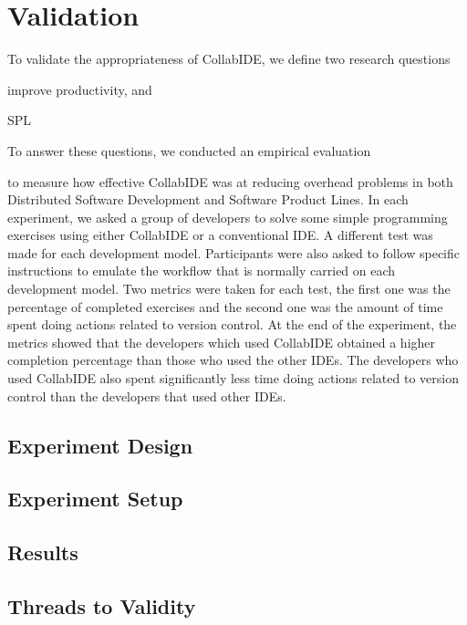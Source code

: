 

\section{Validation}
\label{sec:validation}

To validate the appropriateness of CollabIDE, we define two research questions
\begin{enumerate*}[label=(\arabic*)]
\item improve productivity, and
\item SPL
\end{enumerate*} 
To answer these questions, we conducted an empirical evaluation 

to measure how effective CollabIDE was at reducing overhead problems 
in both Distributed Software Development and Software Product Lines. In each experiment, we asked 
a group of developers to solve some simple programming exercises using either CollabIDE or a 
conventional IDE. A different test was made for each development model. Participants were also 
asked to follow specific instructions to emulate the workflow that is normally carried on each 
development model. Two metrics were taken for each test, the first one was the percentage of 
completed exercises and the second one was the amount of time spent doing actions related to 
version control.
At the end of the experiment, the metrics showed that the developers which used CollabIDE obtained 
a higher completion percentage than those who used the other IDEs. The developers who used 
CollabIDE also spent significantly less time doing actions related to version control than the 
developers that used other IDEs.

\subsection{Experiment Design}


\subsection{Experiment Setup}

	

\subsection{Results}


\subsection{Threads to Validity}



\endinput